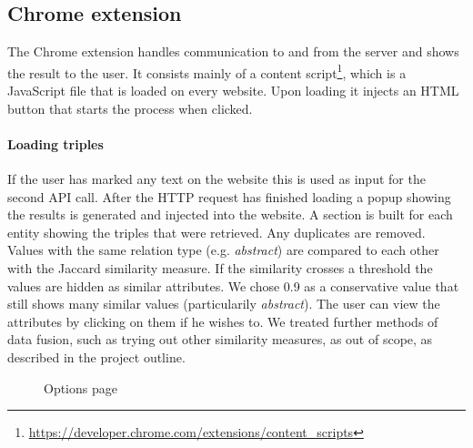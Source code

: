 \subsection{Chrome extension}

The Chrome extension handles communication to and from the server and shows the result to the user. It consists mainly of a content script\footnote{\url{https://developer.chrome.com/extensions/content_scripts}}, which is a JavaScript file that is loaded on every website. Upon loading it injects an HTML button that starts the process when clicked. 

\paragraph{Loading triples}
If the user has marked any text on the website this is used as input for the second API call. After the HTTP request has finished loading a popup showing the results is generated and injected into the website. A section is built for each entity showing the triples that were retrieved. Any duplicates are removed. Values with the same relation type (e.g. \textit{abstract}) are compared to each other with the Jaccard similarity measure. If the similarity crosses a threshold the values are hidden as similar attributes. We chose 0.9 as a conservative value that still shows many similar values (particularily \textit{abstract}). The user can view the attributes by clicking on them if he wishes to. We treated further methods of data fusion, such as trying out other similarity measures, as out of scope, as described in the project outline. 


\begin{figure}
  \caption{Options page}
  \label{fig:options}
\end{figure}

